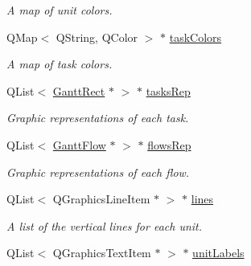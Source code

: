 \begin{DoxyCompactItemize}
\begin{DoxyCompactList}\small\item\em A map of unit colors. \end{DoxyCompactList}\item 
\hypertarget{class_main_window_a26149cc7038562e5b7f1b4143a2f6a29}{}Q\+Map$<$ Q\+String, Q\+Color $>$ $\ast$ \hyperlink{class_main_window_a26149cc7038562e5b7f1b4143a2f6a29}{task\+Colors}\label{class_main_window_a26149cc7038562e5b7f1b4143a2f6a29}

\begin{DoxyCompactList}\small\item\em A map of task colors. \end{DoxyCompactList}\item 
\hypertarget{class_main_window_a71197b2944e569701672e2e8462d7805}{}Q\+List$<$ \hyperlink{class_gantt_rect}{Gantt\+Rect} $\ast$ $>$ $\ast$ \hyperlink{class_main_window_a71197b2944e569701672e2e8462d7805}{tasks\+Rep}\label{class_main_window_a71197b2944e569701672e2e8462d7805}

\begin{DoxyCompactList}\small\item\em Graphic representations of each task. \end{DoxyCompactList}\item 
\hypertarget{class_main_window_ab3c8fa1d1db3eb29de99197692da7028}{}Q\+List$<$ \hyperlink{class_gantt_flow}{Gantt\+Flow} $\ast$ $>$ $\ast$ \hyperlink{class_main_window_ab3c8fa1d1db3eb29de99197692da7028}{flows\+Rep}\label{class_main_window_ab3c8fa1d1db3eb29de99197692da7028}

\begin{DoxyCompactList}\small\item\em Graphic representations of each flow. \end{DoxyCompactList}\item 
\hypertarget{class_main_window_a60463caf2bb888172a6dcbae02004739}{}Q\+List$<$ Q\+Graphics\+Line\+Item $\ast$ $>$ $\ast$ \hyperlink{class_main_window_a60463caf2bb888172a6dcbae02004739}{lines}\label{class_main_window_a60463caf2bb888172a6dcbae02004739}

\begin{DoxyCompactList}\small\item\em A list of the vertical lines for each unit. \end{DoxyCompactList}\item 
\hypertarget{class_main_window_a33c063caa7e87dc13a3d943aabc77a49}{}Q\+List$<$ Q\+Graphics\+Text\+Item $\ast$ $>$ $\ast$ \hyperlink{class_main_window_a33c063caa7e87dc13a3d943aabc77a49}{unit\+Labels}\label{class_main_window_a33c063caa7e87dc13a3d943aabc77a49}


\end{DoxyCompactItemize}
